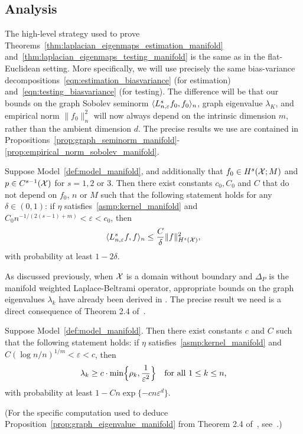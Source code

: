 \subsection{Analysis}
The high-level strategy used to prove Theorems~\ref{thm:laplacian_eigenmaps_estimation_manifold} and~\ref{thm:laplacian_eigenmaps_testing_manifold} is the same as in the flat-Euclidean setting. More specifically, we will use precisely the same bias-variance decompositions~\eqref{eqn:estimation_biasvariance} (for estimation) and~\eqref{eqn:testing_biasvariance} (for testing). The difference will be that our bounds on the graph Sobolev seminorm $\langle L_{n,\varepsilon}^sf_0, f_0 \rangle_n$, graph eigenvalue $\lambda_K$, and empirical norm $\|f_0\|_n^2$ will now always depend on the intrinsic dimension $m$, rather than the ambient dimension $d$. The precise results we use are contained in Propositions~\ref{prop:graph_seminorm_manifold}-\ref{prop:empirical_norm_sobolev_manifold}.
\begin{proposition}
	\label{prop:graph_seminorm_manifold} 
	Suppose Model~\ref{def:model_manifold}, and additionally that $f_0 \in H^s(\mathcal{X};M)$ and $p \in C^{s - 1}(\mathcal{X})$ for $s = 1,2$ or $3$. Then there exist constants $c_0,C_0$ and $C$ that do not depend on $f_0$, $n$ or $M$ such that the following statement holds for any $\delta \in (0,1)$: if $\eta$ satisfies~\ref{asmp:kernel_manifold} and $C_0n^{-1/(2(s - 1) + m)} < \varepsilon < c_0$, then
	\begin{equation}
	\label{eqn:graph_seminorm_manifold}
	\langle L_{n,\varepsilon}^s f, f \rangle_n \leq \frac{C}{\delta} \|f\|_{H^s(\mathcal{X})}^2,
	\end{equation}
	with probability at least $1 - 2\delta$.
\end{proposition}

As discussed previously, when $\mathcal{X}$ is a domain without boundary and $\Delta_P$ is the manifold weighted Laplace-Beltrami operator, appropriate bounds on the graph eigenvalues $\lambda_k$ have already been derived in \citep{burago2014,trillos2019,garciatrillos19}. The precise result we need is a direct consequence of Theorem 2.4 of~\citep{calder2019}.
\begin{proposition}
	\label{prop:graph_eigenvalue_manifold}
	Suppose Model~\ref{def:model_manifold}. Then there exist constants $c$ and $C$ such that the following statement holds: if $\eta$ satisfies~\ref{asmp:kernel_manifold} and $C(\log n/n)^{1/m} < \varepsilon < c$, then
	\begin{equation}
	\label{eqn:graph_eigenvalue_manifold}
	\lambda_k \geq c \cdot \min\Bigl\{\rho_k, \frac{1}{\varepsilon^{2}} \Bigr\} \quad \textrm{for all $1 \leq k \leq n$,}
	\end{equation}
	with probability at least $1 - Cn\exp\{-c n\varepsilon^d\}$. 
\end{proposition}
(For the specific computation used to deduce Proposition~\ref{prop:graph_eigenvalue_manifold} from Theorem 2.4 of~\citep{calder2019}, see~\cite{green2021}.)

